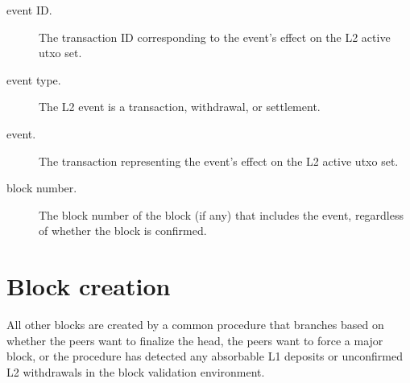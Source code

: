 \documentclass[../hydrozoa.tex]{subfiles}
\begin{document}
\begin{description}
\begin{description}
      \item[event ID.] The transaction ID corresponding to the event's effect on the L2 active utxo set.
      \item[event type.] The L2 event is a transaction, withdrawal, or settlement.
      \item[event.] The transaction representing the event's effect on the L2 active utxo set.
      \item[block number.] The block number of the block (if any) that includes the event, regardless of whether the block is confirmed.
    \end{description}
\end{description}

\section{Block creation}%
\label{h:l2-block-creation}%

All other blocks are created by a common procedure that branches based on whether the peers want to finalize the head, the peers want to force a major block, or the procedure has detected any absorbable L1 deposits or unconfirmed L2 withdrawals in the block validation environment.
\end{document}
